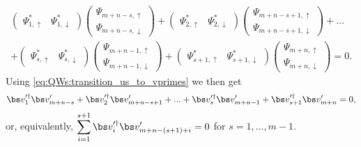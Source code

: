 \begin{equation}
\begin{aligned}
	\begin{pmatrix}
		\Psi^*_{1, \uparrow} & \Psi^*_{1, \downarrow}
	\end{pmatrix}
	\begin{pmatrix}
		\Psi_{m+n-s, \uparrow} \\ \Psi_{m+n-s, \downarrow}
	\end{pmatrix}
	+
	\begin{pmatrix}
		\Psi^*_{2, \uparrow} & \Psi^*_{2, \downarrow}
	\end{pmatrix}
	\begin{pmatrix}
		\Psi_{m+n-s+1, \uparrow} \\ \Psi_{m+n-s+1, \downarrow}
	\end{pmatrix} + \dots\\
	+ 
	\begin{pmatrix}
		\Psi^*_{s, \uparrow} & \Psi^*_{s, \downarrow}
	\end{pmatrix}
	\begin{pmatrix}
		\Psi_{m+n-1, \uparrow} \\ \Psi_{m+n-1, \downarrow}
	\end{pmatrix}
	+
	\begin{pmatrix}
		\Psi^*_{s+1, \uparrow} & \Psi^*_{s+1, \downarrow}
	\end{pmatrix}
	\begin{pmatrix}
		\Psi_{m+n, \uparrow} \\ \Psi_{m+n, \downarrow}
	\end{pmatrix} = 0.
\end{aligned}
\end{equation}
Using \cref{eq:QWs:transition_us_to_vprimes} we then get
\begin{equation}
	\bs v^{\prime\dagger}_1 \bs v^\prime_{m+n-s} +
	\bs v^{\prime\dagger}_2 \bs v^\prime_{m+n-s+1} +
	... +
    \bs v^{\prime\dagger}_{s} \bs v^\prime_{m+n-1} +
	\bs v^{\prime\dagger}_{s+1} \bs v^\prime_{m+n} = 0,
\end{equation}
or, equivalently,
$\displaystyle \sum_{i=1}^{s+1} \bs v^{\prime\dagger}_i \bs v^\prime_{m+n-(s+1)+i}=0$
for $s=1,\dots,m-1$.

